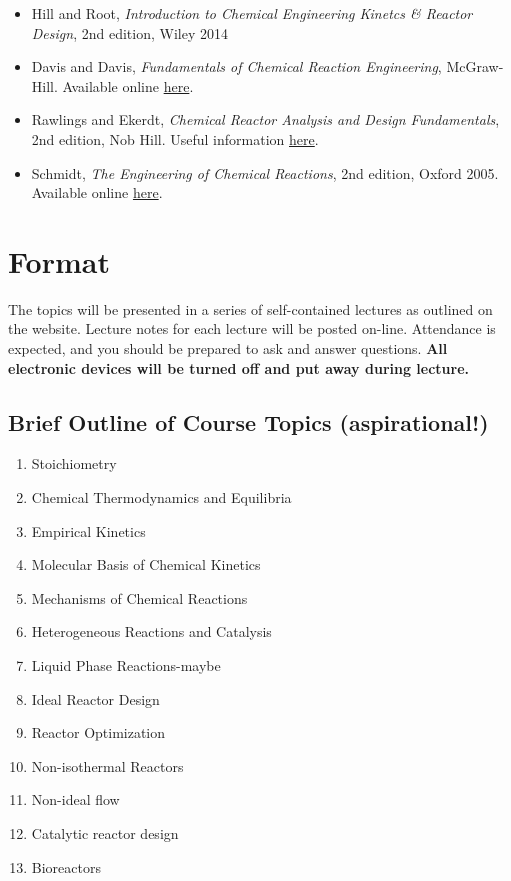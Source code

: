 \documentclass[11pt]{article}
\begin{document}
\begin{itemize}
\item Hill and Root, \emph{Introduction to Chemical Engineering Kinetcs \& Reactor Design}, 2nd edition, Wiley 2014
\item Davis and Davis, \emph{Fundamentals of Chemical Reaction Engineering}, McGraw-Hill. Available online \href{https://authors.library.caltech.edu/25070/}{here}.
\item Rawlings and Ekerdt, \emph{Chemical Reactor Analysis and Design Fundamentals}, 2nd edition, Nob Hill. Useful information \href{https://sites.engineering.ucsb.edu/\~jbraw/chemreacfun/}{here}.
\item Schmidt, \emph{The Engineering of Chemical Reactions}, 2nd edition, Oxford 2005. Available online \href{https://app.knovel.com/kn/resources/kpECRE0001/toc}{here}.
\end{itemize}
\section{Format}
\label{sec:org9ea72dc}
The topics will be presented in a series of self-contained lectures as outlined on the website. Lecture notes for each lecture will be posted on-line. Attendance is expected, and you should be prepared to ask and answer questions. \textbf{All electronic devices will be turned off and put away during lecture.}
\subsection{Brief Outline of Course Topics (aspirational!)}
\label{sec:org11f1997}
\begin{enumerate}
\item Stoichiometry
\item Chemical Thermodynamics and Equilibria
\item Empirical Kinetics
\item Molecular Basis of Chemical Kinetics
\item Mechanisms of Chemical Reactions
\item Heterogeneous Reactions and Catalysis
\item Liquid Phase Reactions-maybe
\item Ideal Reactor Design
\item Reactor Optimization
\item Non-isothermal Reactors
\item Non-ideal flow
\item Catalytic reactor design
\item Bioreactors
\end{enumerate}
\end{document}
